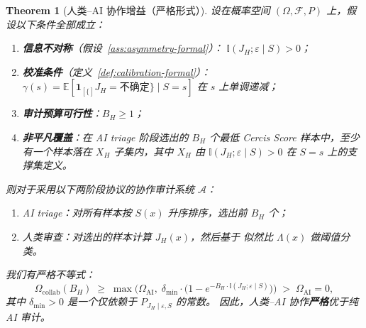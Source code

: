\documentclass[12pt,a4paper]{article}
\newtheorem{theorem}{Theorem}[section]
\newcommand{\E}{\mathbb{E}}
\newcommand{\I}{\mathbb{I}}
\newcommand{\cA}{\mathcal{A}}
\newcommand{\cF}{\mathcal{F}}
\newcommand{\ind}[1]{\mathbf{1}_{[#1]}}
\begin{document}
\begin{theorem}[人类--AI 协作增益（严格形式）]
\label{thm:collab-gain}
设在概率空间 $(\Omega, \cF, P)$ 上，假设以下条件全部成立：
\begin{enumerate}[label=(H\arabic*)]
    \item \textbf{信息不对称}（假设~\ref{ass:asymmetry-formal}）：
          $\I(J_H; \varepsilon \mid S) > 0$；
    \item \textbf{校准条件}（定义~\ref{def:calibration-formal}）：
          $\gamma(s) = \E[\ind\{J_H=\text{不确定}\} \mid S=s]$ 在 $s$ 上单调递减；
    \item \textbf{审计预算可行性}：$B_H \geq 1$；
    \item \textbf{非平凡覆盖}：在 AI triage 阶段选出的 $B_H$ 个最低 Cercis Score
          样本中，至少有一个样本落在 $X_H$ 子集内，其中 $X_H$ 由
          $\I(J_H; \varepsilon \mid S) > 0$ 在 $S=s$ 上的支撑集定义。
\end{enumerate}
则对于采用以下两阶段协议的协作审计系统 $\cA$：
\begin{enumerate}
    \item AI triage：对所有样本按 $S(x)$ 升序排序，选出前 $B_H$ 个；
    \item 人类审查：对选出的样本计算 $J_H(x)$，然后基于
          似然比 $\Lambda(x)$ 做阈值分类。
\end{enumerate}
我们有严格不等式：
\begin{equation}\label{eq:collab-gain-strict}
    \Omega_{\mathrm{collab}}(B_H) \;\geq\; \max\Big(
        \Omega_{\mathrm{AI}},\;
        \delta_{\min} \cdot \big(1 - e^{-B_H \cdot \I(J_H; \varepsilon \mid S)}\big)
    \Big) \;>\; \Omega_{\mathrm{AI}} = 0,
\end{equation}
其中 $\delta_{\min} > 0$ 是一个仅依赖于 $P_{J_H \mid \varepsilon, S}$ 的常数。
因此，人类--AI 协作\textbf{严格}优于纯 AI 审计。
\label{thm:collab-gain-end}
\end{theorem}
\end{document}
